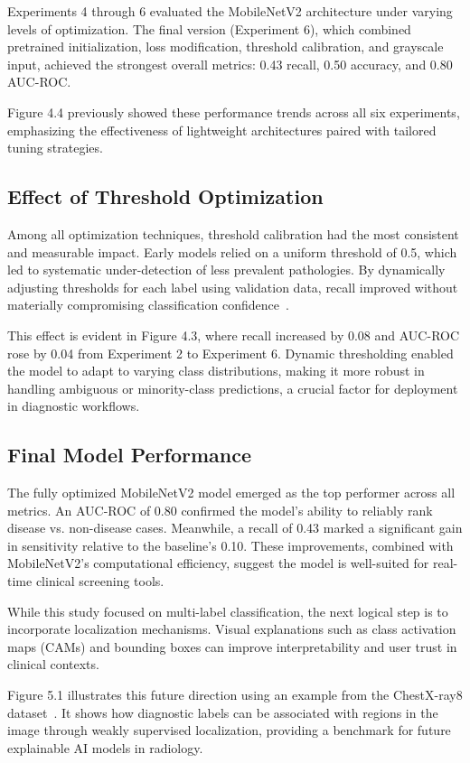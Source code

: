 \documentclass[12pt]{article}
\begin{document}
\begin{multicols}{2}
Experiments 4 through 6 evaluated the MobileNetV2 architecture under varying levels of optimization. The final version (Experiment 6), which combined pretrained initialization, loss modification, threshold calibration, and grayscale input, achieved the strongest overall metrics: 0.43 recall, 0.50 accuracy, and 0.80 AUC-ROC.

Figure 4.4 previously showed these performance trends across all six experiments, emphasizing the effectiveness of lightweight architectures paired with tailored tuning strategies.

\subsection{Effect of Threshold Optimization}
Among all optimization techniques, threshold calibration had the most consistent and measurable impact. Early models relied on a uniform threshold of 0.5, which led to systematic under-detection of less prevalent pathologies. By dynamically adjusting thresholds for each label using validation data, recall improved without materially compromising classification confidence~\cite{12}.

This effect is evident in Figure 4.3, where recall increased by 0.08 and AUC-ROC rose by 0.04 from Experiment 2 to Experiment 6. Dynamic thresholding enabled the model to adapt to varying class distributions, making it more robust in handling ambiguous or minority-class predictions, a crucial factor for deployment in diagnostic workflows.

\subsection{Final Model Performance}
The fully optimized MobileNetV2 model emerged as the top performer across all metrics. An AUC-ROC of 0.80 confirmed the model's ability to reliably rank disease vs. non-disease cases. Meanwhile, a recall of 0.43 marked a significant gain in sensitivity relative to the baseline's 0.10. These improvements, combined with MobileNetV2's computational efficiency, suggest the model is well-suited for real-time clinical screening tools.

While this study focused on multi-label classification, the next logical step is to incorporate localization mechanisms. Visual explanations such as class activation maps (CAMs) and bounding boxes can improve interpretability and user trust in clinical contexts.


Figure 5.1 illustrates this future direction using an example from the ChestX-ray8 dataset~\cite{wang2017chestx}. It shows how diagnostic labels can be associated with regions in the image through weakly supervised localization, providing a benchmark for future explainable AI models in radiology.


\end{multicols}
\end{document}
